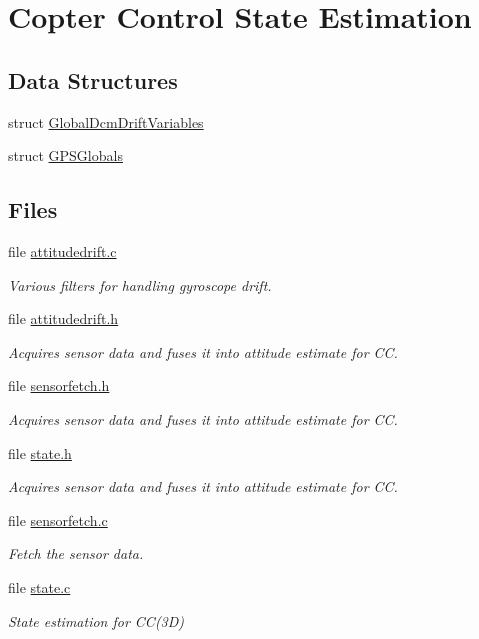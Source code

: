 \hypertarget{group___c_c_state}{\section{\-Copter \-Control \-State \-Estimation}
\label{group___c_c_state}
}
\subsection*{\-Data \-Structures}
\begin{DoxyCompactItemize}
\item 
struct \hyperlink{struct_global_dcm_drift_variables}{\-Global\-Dcm\-Drift\-Variables}
\item 
struct \hyperlink{struct_g_p_s_globals}{\-G\-P\-S\-Globals}
\end{DoxyCompactItemize}
\subsection*{\-Files}
\begin{DoxyCompactItemize}
\item 
file \hyperlink{attitudedrift_8c}{attitudedrift.\-c}
\begin{DoxyCompactList}\small\item\em \-Various filters for handling gyroscope drift. \end{DoxyCompactList}\item 
file \hyperlink{attitudedrift_8h}{attitudedrift.\-h}
\begin{DoxyCompactList}\small\item\em \-Acquires sensor data and fuses it into attitude estimate for \-C\-C. \end{DoxyCompactList}\item 
file \hyperlink{sensorfetch_8h}{sensorfetch.\-h}
\begin{DoxyCompactList}\small\item\em \-Acquires sensor data and fuses it into attitude estimate for \-C\-C. \end{DoxyCompactList}\item 
file \hyperlink{state_8h}{state.\-h}
\begin{DoxyCompactList}\small\item\em \-Acquires sensor data and fuses it into attitude estimate for \-C\-C. \end{DoxyCompactList}\item 
file \hyperlink{sensorfetch_8c}{sensorfetch.\-c}
\begin{DoxyCompactList}\small\item\em \-Fetch the sensor data. \end{DoxyCompactList}\item 
file \hyperlink{state_8c}{state.\-c}
\begin{DoxyCompactList}\small\item\em \-State estimation for \-C\-C(3\-D) \end{DoxyCompactList}\end{DoxyCompactItemize}

